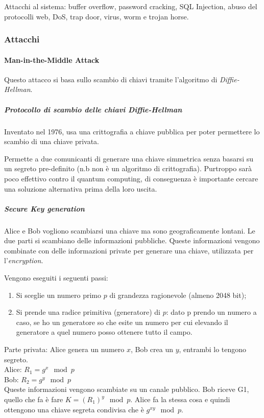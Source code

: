 Attacchi al sistema: buffer overflow, password cracking, SQL Injection, abuso 
del protocolli web, DoS, trap door, virus, worm e trojan horse.

\subsubsection{Attacchi}

\paragraph{Man-in-the-Middle Attack}

Questo attacco si basa sullo scambio di chiavi tramite l'algoritmo di
\textit{Diffie-Hellman}.

\subparagraph{Protocollo di scambio delle chiavi Diffie-Hellman}

Inventato nel 1976, usa una crittografia a chiave pubblica per poter 
permettere lo scambio di una chiave privata.

Permette a due comunicanti di generare una chiave simmetrica senza basarsi su
un segreto pre-definito (n.b non è un algoritmo di crittografia).
Purtroppo sarà poco effettivo contro il quantum computing, di conseguenza è 
importante cercare una soluzione alternativa prima della loro uscita.

\subparagraph{Secure Key generation}

Alice e Bob vogliono scambiarsi una chiave ma sono geograficamente lontani.
Le due parti si scambiano delle informazioni pubbliche. Queste informazioni
vengono combinate con delle informazioni private per generare una chiave,
utilizzata per l'\textit{encryption}.


Vengono eseguiti i seguenti passi:

\begin{enumerate}
 \item Si sceglie un numero primo $p$ di grandezza ragionevole (almeno 2048
 bit);
 \item Si prende una radice primitiva (generatore) di $p$: dato p prendo un
 numero a caso, se ho un generatore so che esite un numero per cui elevando il
 generatore a quel numero posso ottenere tutto il campo.
\end{enumerate}


Parte privata: Alice genera un numero $x$, Bob crea un $y$, entrambi lo tengono
segreto.\\
\newline
Alice: $R_1 = g^x \mod p$\\
Bob: $R_2 = g^y \mod p$\\
\newline
Queste informazioni vengono scambiate su un canale pubblico. Bob riceve G1, 
quello che fa è fare $K = (R_1)^y \mod p$. Alice fa la stessa cosa e quindi 
ottengono una chiave segreta condivisa che è $g^{xy} \mod p$.

